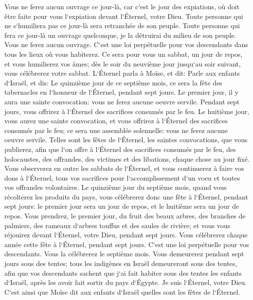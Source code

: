 \verse Vous ne ferez aucun ouvrage ce jour-là, car c`est le jour des expiations, où doit être faite pour vous l`expiation devant l`Éternel, votre Dieu. 
\verse Toute personne qui ne s`humiliera pas ce jour-là sera retranchée de son peuple. 
\verse Toute personne qui fera ce jour-là un ouvrage quelconque, je la détruirai du milieu de son peuple. 
\verse Vous ne ferez aucun ouvrage. C`est une loi perpétuelle pour vos descendants dans tous les lieux où vous habiterez. 
\verse Ce sera pour vous un sabbat, un jour de repos, et vous humilierez vos âmes; dès le soir du neuvième jour jusqu`au soir suivant, vous célébrerez votre sabbat. 
\verse L`Éternel parla à Moïse, et dit: 
\verse Parle aux enfants d`Israël, et dis: Le quinzième jour de ce septième mois, ce sera la fête des tabernacles en l`honneur de l`Éternel, pendant sept jours. 
\verse Le premier jour, il y aura une sainte convocation: vous ne ferez aucune oeuvre servile. 
\verse Pendant sept jours, vous offrirez à l`Éternel des sacrifices consumés par le feu. Le huitième jour, vous aurez une sainte convocation, et vous offrirez à l`Éternel des sacrifices consumés par le feu; ce sera une assemblée solennelle: vous ne ferez aucune oeuvre servile. 
\verse Telles sont les fêtes de l`Éternel, les saintes convocations, que vous publierez, afin que l`on offre à l`Éternel des sacrifices consumés par le feu, des holocaustes, des offrandes, des victimes et des libations, chaque chose au jour fixé. 
\verse Vous observerez en outre les sabbats de l`Éternel, et vous continuerez à faire vos dons à l`Éternel, tous vos sacrifices pour l`accomplissement d`un voeu et toutes vos offrandes volontaires. 
\verse Le quinzième jour du septième mois, quand vous récolterez les produits du pays, vous célébrerez donc une fête à l`Éternel, pendant sept jours: le premier jour sera un jour de repos, et le huitième sera un jour de repos. 
\verse Vous prendrez, le premier jour, du fruit des beaux arbres, des branches de palmiers, des rameaux d`arbres touffus et des saules de rivière; et vous vous réjouirez devant l`Éternel, votre Dieu, pendant sept jours. 
\verse Vous célébrerez chaque année cette fête à l`Éternel, pendant sept jours. C`est une loi perpétuelle pour vos descendants. Vous la célébrerez le septième mois. 
\verse Vous demeurerez pendant sept jours sous des tentes; tous les indigènes en Israël demeureront sous des tentes, 
\verse afin que vos descendants sachent que j`ai fait habiter sous des tentes les enfants d`Israël, après les avoir fait sortir du pays d`Égypte. Je suis l`Éternel, votre Dieu. 
\verse C`est ainsi que Moïse dit aux enfants d`Israël quelles sont les fêtes de l`Éternel. 

